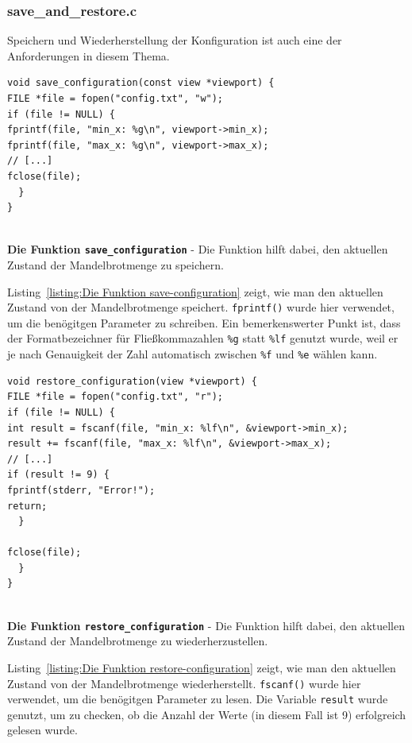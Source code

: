 \documentclass[ngerman,12pt,a4paper,titlepage]{article}
\begin{document}
\subsubsection{save\_and\_restore.c}
\begin{sloppypar}

Speichern und Wiederherstellung der Konfiguration ist auch eine der Anforderungen in diesem Thema.

\begin{listing}[H]
	\begin{verbatim}
void save_configuration(const view *viewport) {
FILE *file = fopen("config.txt", "w");
if (file != NULL) {
fprintf(file, "min_x: %g\n", viewport->min_x);
fprintf(file, "max_x: %g\n", viewport->max_x);
// [...]
fclose(file);
  }
}
		
	\end{verbatim}
	\caption[\textbf{Die Funktion \texttt{save\_configuration}}]{\textbf{Die Funktion \texttt{save\_configuration}} - Die Funktion hilft dabei, den aktuellen Zustand der Mandelbrotmenge zu speichern.}
	\label{listing:Die Funktion save-configuration}
\end{listing}
Listing~\ref{listing:Die Funktion save-configuration} zeigt, wie man den aktuellen Zustand von der Mandelbrotmenge speichert. \texttt{fprintf()} wurde hier verwendet, um die benögitgen Parameter zu schreiben. Ein bemerkenswerter Punkt ist, dass der Formatbezeichner für Fließkommazahlen \texttt{\%g} statt \texttt{\%lf} genutzt wurde, weil er je nach Genauigkeit der Zahl automatisch zwischen \texttt{\%f} und \texttt{\%e} wählen kann.
	
\begin{listing}[H]
	\begin{verbatim}
void restore_configuration(view *viewport) {
FILE *file = fopen("config.txt", "r");
if (file != NULL) {
int result = fscanf(file, "min_x: %lf\n", &viewport->min_x);
result += fscanf(file, "max_x: %lf\n", &viewport->max_x);
// [...]
if (result != 9) {
fprintf(stderr, "Error!");
return;
  }
			
fclose(file);
  }
}
		
	\end{verbatim}
	\caption[\textbf{Die Funktion \texttt{restore\_configuration}}]{\textbf{Die Funktion \texttt{restore\_configuration}} - Die Funktion hilft dabei, den aktuellen Zustand der Mandelbrotmenge zu wiederherzustellen.}
	\label{listing:Die Funktion restore-configuration}
\end{listing}
	Listing~\ref{listing:Die Funktion restore-configuration} zeigt, wie man den aktuellen Zustand von der Mandelbrotmenge wiederherstellt. \texttt{fscanf()} wurde hier verwendet, um die benögitgen Parameter zu lesen. Die Variable \texttt{result} wurde genutzt, um zu checken, ob die Anzahl der Werte (in diesem Fall ist 9) erfolgreich gelesen wurde.
\end{sloppypar}
\end{document}
